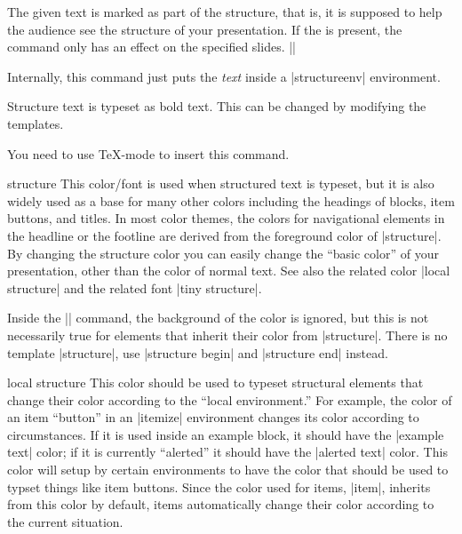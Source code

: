 \begin{command}{\structure{}}
  The given text is marked as part of the structure, that is, it is
  supposed to help the audience see the structure of your
  presentation. If the  is present, the
  command only has an effect on the specified slides.
  \example||

  Internally, this command just puts the \emph{text} inside a
  |structureenv| environment.
 
  \articlenote
  Structure text is typeset as bold text. This can be changed by
  modifying the templates.

  \lyxnote
  You need to use \TeX-mode to insert this command.

  \begin{element}{structure}\no\yes\yes
    This color/font is used when structured text is typeset, but it is
    also widely used as a base for many other colors including the
    headings of blocks, item buttons, and titles. In most color
    themes, the colors for navigational elements in the headline or
    the footline are derived from the foreground color of
    |structure|. By changing the structure color you can easily change
    the ``basic color'' of your presentation, other than the color of
    normal text. See also the related color |local structure| and the
    related font |tiny structure|.
    
    Inside the |\structure| command, the background of the color is
    ignored, but this is not necessarily true for elements that
    inherit their color from |structure|. There is no template
    |structure|, use |structure begin| and |structure end| instead.
  \end{element}
 
  \begin{element}{local structure}\no\yes\no
    This color should be used to typeset structural elements that change
    their color according to the ``local environment.'' For example, the
    color of an item ``button'' in an |itemize| environment changes its
    color according to circumstances. If it is used inside an example
    block, it should have the |example text| color; if it is currently
    ``alerted'' it should have the |alerted text| color. This color
    will setup by certain environments to have the color that should be
    used to typset things like item buttons. Since the color used for
    items, |item|, inherits from this color by default, items
    automatically change their color according to the current
    situation.


\end{element}
\end{command}
